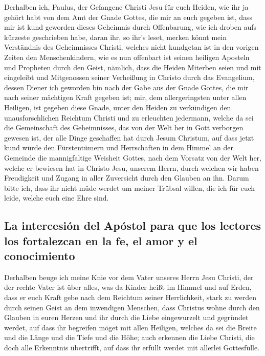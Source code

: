  Derhalben ich, Paulus, der Gefangene Christi Jesu für
euch Heiden,  wie ihr ja gehört habt von dem Amt der Gnade
Gottes, die mir an euch gegeben ist,  dass mir ist kund
geworden dieses Geheimnis durch Offenbarung, wie ich droben aufs
kürzeste geschrieben habe,  daran ihr, so ihr's leset,
merken könnt mein Verständnis des Geheimnisses Christi, 
welches nicht kundgetan ist in den vorigen Zeiten den Menschenkindern,
wie es nun offenbart ist seinen heiligen Aposteln und Propheten durch
den Geist,  nämlich, dass die Heiden Miterben seien und
mit eingeleibt und Mitgenossen seiner Verheißung in Christo durch das
Evangelium,  dessen Diener ich geworden bin nach der Gabe
aus der Gnade Gottes, die mir nach seiner mächtigen Kraft gegeben ist;
 mir, dem allergeringsten unter allen Heiligen, ist
gegeben diese Gnade, unter den Heiden zu verkündigen den
unausforschlichen Reichtum Christi  und zu erleuchten
jedermann, welche da sei die Gemeinschaft des Geheimnisses, das von der
Welt her in Gott verborgen gewesen ist, der alle Dinge geschaffen hat
durch Jesum Christum,  auf dass jetzt kund würde den
Fürstentümern und Herrschaften in dem Himmel an der Gemeinde die
mannigfaltige Weisheit Gottes,  nach dem Vorsatz von der
Welt her, welche er bewiesen hat in Christo Jesu, unserem Herrn,
 durch welchen wir haben Freudigkeit und Zugang in aller
Zuversicht durch den Glauben an ihn.  Darum bitte ich,
dass ihr nicht müde werdet um meiner Trübsal willen, die ich für euch
leide, welche euch eine Ehre sind.

\hypertarget{la-intercesiuxf3n-del-apuxf3stol-para-que-los-lectores-los-fortalezcan-en-la-fe-el-amor-y-el-conocimiento}{%
\subsection{La intercesión del Apóstol para que los lectores los
fortalezcan en la fe, el amor y el
conocimiento}\label{la-intercesiuxf3n-del-apuxf3stol-para-que-los-lectores-los-fortalezcan-en-la-fe-el-amor-y-el-conocimiento}}

 Derhalben beuge ich meine Knie vor dem Vater unseres
Herrn Jesu Christi,  der der rechte Vater ist über alles,
was da Kinder heißt im Himmel und auf Erden,  dass er
euch Kraft gebe nach dem Reichtum seiner Herrlichkeit, stark zu werden
durch seinen Geist an dem inwendigen Menschen,  dass
Christus wohne durch den Glauben in euren Herzen und ihr durch die Liebe
eingewurzelt und gegründet werdet,  auf dass ihr
begreifen möget mit allen Heiligen, welches da sei die Breite und die
Länge und die Tiefe und die Höhe;  auch erkennen die
Liebe Christi, die doch alle Erkenntnis übertrifft, auf dass ihr erfüllt
werdet mit allerlei Gottesfülle.

